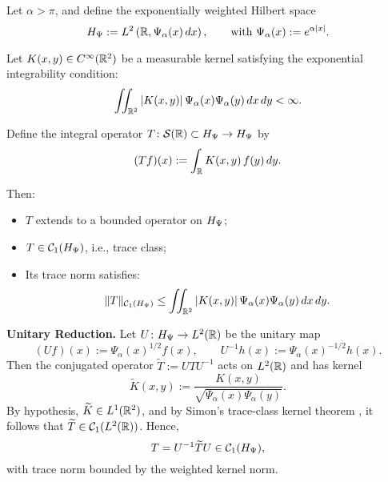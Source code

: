 \begin{lemma}
\label{lem:trace_class_via_weighted_L1}
Let \( \alpha > \pi \), and define the exponentially weighted Hilbert space
\[
H_{\Psi} := L^2\left(\mathbb{R}, \Psi_\alpha(x)\, dx\right), \qquad \text{with } \Psi_\alpha(x) := e^{\alpha |x|}.
\]

Let \( K(x,y) \in C^\infty(\mathbb{R}^2) \) be a measurable kernel satisfying the exponential integrability condition:
\[
\iint_{\mathbb{R}^2} |K(x,y)|\, \Psi_\alpha(x) \Psi_\alpha(y)\, dx\, dy < \infty.
\]

Define the integral operator \( T \colon \mathcal{S}(\mathbb{R}) \subset H_{\Psi} \to H_{\Psi} \) by
\[
(Tf)(x) := \int_{\mathbb{R}} K(x,y)\, f(y)\, dy.
\]

Then:
\begin{itemize}
    \item \( T \) extends to a bounded operator on \( H_{\Psi} \);
    \item \( T \in \mathcal{C}_1(H_{\Psi}) \), i.e., trace class;
    \item Its trace norm satisfies:
    \[
    \|T\|_{\mathcal{C}_1(H_{\Psi})} \le \iint_{\mathbb{R}^2} |K(x,y)|\, \Psi_\alpha(x)\Psi_\alpha(y)\, dx\, dy.
    \]
\end{itemize}

\medskip
\noindent\textbf{Unitary Reduction.}
Let \( U \colon H_{\Psi} \to L^2(\mathbb{R}) \) be the unitary map
\[
(Uf)(x) := \Psi_\alpha(x)^{1/2} f(x), \qquad U^{-1} h(x) := \Psi_\alpha(x)^{-1/2} h(x).
\]
Then the conjugated operator \( \widetilde{T} := U T U^{-1} \) acts on \( L^2(\mathbb{R}) \) and has kernel
\[
\widetilde{K}(x,y) := \frac{K(x,y)}{\sqrt{\Psi_\alpha(x)\Psi_\alpha(y)}}.
\]
By hypothesis, \( \widetilde{K} \in L^1(\mathbb{R}^2) \), and by Simon’s trace-class kernel theorem \cite[Thm.~4.2]{Simon2005TraceIdeals}, it follows that \( \widetilde{T} \in \mathcal{C}_1(L^2(\mathbb{R})) \). Hence,
\[
T = U^{-1} \widetilde{T} U \in \mathcal{C}_1(H_{\Psi}),
\]
with trace norm bounded by the weighted kernel norm.
\end{lemma}
